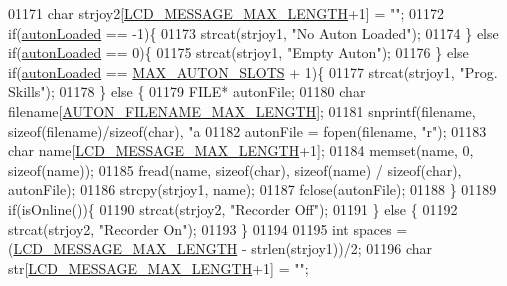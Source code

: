 \begin{DoxyCode}
{{{{{{{{{{{{{{{01171         \textcolor{keywordtype}{char} strjoy2[\hyperlink{lcdmsg_8h_abe4c4b70fc6f44ae3680e5b2c68cdd00}{LCD\_MESSAGE\_MAX\_LENGTH}+1] = \textcolor{stringliteral}{""};
01172         \textcolor{keywordflow}{if}(\hyperlink{autonrecorder_8c_a4e72d907ee74449b71b5e20943f4217e}{autonLoaded} == -1)\{
01173             strcat(strjoy1, \textcolor{stringliteral}{"No Auton Loaded"});
01174         \} \textcolor{keywordflow}{else} \textcolor{keywordflow}{if}(\hyperlink{autonrecorder_8c_a4e72d907ee74449b71b5e20943f4217e}{autonLoaded} == 0)\{
01175             strcat(strjoy1, \textcolor{stringliteral}{"Empty Auton"});
01176         \} \textcolor{keywordflow}{else} \textcolor{keywordflow}{if}(\hyperlink{autonrecorder_8c_a4e72d907ee74449b71b5e20943f4217e}{autonLoaded} == \hyperlink{autonrecorder_8h_a5173a11a545cb4020fdd139552dc15c1}{MAX\_AUTON\_SLOTS} + 1)\{
01177             strcat(strjoy1, \textcolor{stringliteral}{"Prog. Skills"});
01178         \} \textcolor{keywordflow}{else} \{
01179             FILE* autonFile;
01180             \textcolor{keywordtype}{char} filename[\hyperlink{autonrecorder_8h_a9411d1482daa18dd8221c30db7fc6e4e}{AUTON\_FILENAME\_MAX\_LENGTH}];
01181             snprintf(filename, \textcolor{keyword}{sizeof}(filename)/\textcolor{keyword}{sizeof}(\textcolor{keywordtype}{char}), \textcolor{stringliteral}{"a%
01182             autonFile = fopen(filename, \textcolor{stringliteral}{"r"});
01183             \textcolor{keywordtype}{char} name[\hyperlink{lcdmsg_8h_abe4c4b70fc6f44ae3680e5b2c68cdd00}{LCD\_MESSAGE\_MAX\_LENGTH}+1];
01184             memset(name, 0, \textcolor{keyword}{sizeof}(name));
01185             fread(name, \textcolor{keyword}{sizeof}(\textcolor{keywordtype}{char}), \textcolor{keyword}{sizeof}(name) / \textcolor{keyword}{sizeof}(\textcolor{keywordtype}{char}), autonFile);
01186             strcpy(strjoy1, name);
01187             fclose(autonFile);
01188         \}
01189         \textcolor{keywordflow}{if}(isOnline())\{
01190             strcat(strjoy2, \textcolor{stringliteral}{"Recorder Off"});
01191         \} \textcolor{keywordflow}{else} \{
01192             strcat(strjoy2, \textcolor{stringliteral}{"Recorder On"});
01193         \}
01194 
01195         \textcolor{keywordtype}{int} spaces = (\hyperlink{lcdmsg_8h_abe4c4b70fc6f44ae3680e5b2c68cdd00}{LCD\_MESSAGE\_MAX\_LENGTH} - strlen(strjoy1))/2;
01196         \textcolor{keywordtype}{char} str[\hyperlink{lcdmsg_8h_abe4c4b70fc6f44ae3680e5b2c68cdd00}{LCD\_MESSAGE\_MAX\_LENGTH}+1] = \textcolor{stringliteral}{""};
}}}}}}}}}}}}}}}}
\end{DoxyCode}
